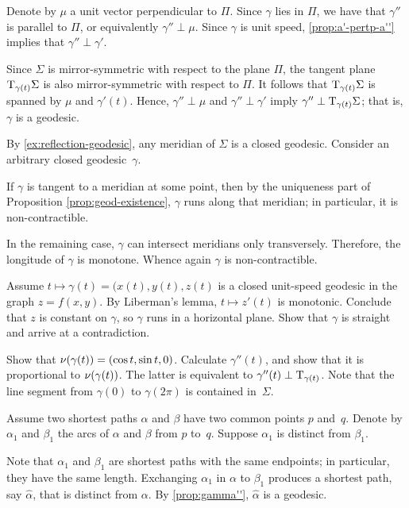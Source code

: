 \begin{multicols}{2}
Denote by $\mu$ a unit vector perpendicular to $\Pi$.
Since $\gamma$ lies in $\Pi$, we have that $\gamma''$ is parallel to $\Pi$, or equivalently $\gamma''\perp \mu$.
Since $\gamma$ is unit speed, \ref{prop:a'-pertp-a''} implies that $\gamma''\perp\gamma'$.

Since $\Sigma$ is mirror-symmetric with respect to the plane $\Pi$,
the tangent plane $\mathrm{T}_{\gamma(t)}\Sigma$ is also mirror-symmetric with respect to $\Pi$.
It follows that $\mathrm{T}_{\gamma(t)}\Sigma$ is spanned by $\mu$ and $\gamma'(t)$.
Hence, $\gamma''\perp \mu$ and $\gamma''\perp\gamma'$ imply $\gamma''\perp\mathrm{T}_{\gamma(t)}\Sigma$;
that is, $\gamma$ is a geodesic.



By \ref{ex:reflection-geodesic}, any meridian of $\Sigma$ is a closed geodesic.
Consider an arbitrary closed geodesic~$\gamma$.

If $\gamma$ is tangent to a meridian at some point, then by the uniqueness part of Proposition \ref{prop:geod-existence}, $\gamma$ runs along that meridian;
in particular, it is non-contractible.

In the remaining case, $\gamma$ can intersect meridians only transversely.
Therefore, the longitude of $\gamma$ is monotone.
Whence again $\gamma$ is non-contractible.

 Assume $t\mapsto \gamma(t)=(x(t),y(t),z(t)$ is a closed unit-speed geodesic in the graph $z=f(x,y)$.
By Liberman's lemma, $t\mapsto z'(t)$ is monotonic.
Conclude that $z$ is constant on $\gamma$, so $\gamma$ runs in a horizontal plane.
Show that $\gamma$ is straight and arrive at a contradiction.

Show that $\nu(\gamma(t))=(\cos t,\sin t, 0)$.
Calculate $\gamma''(t)$, and show that it is proportional to $\nu(\gamma(t))$.
The latter is equivalent to $\gamma''(t)\perp\mathrm{T}_{\gamma(t)}$. 
Note that the line segment from $\gamma (0) $ to $\gamma (2 \pi) $ is contained in~$\Sigma$.



Assume two shortest paths $\alpha$ and $\beta$ have two common points $p$ and~$q$.
Denote by $\alpha_1$ and $\beta_1$ the arcs of $\alpha$ and $\beta$ from $p$ to~$q$.
Suppose $\alpha_1$ is distinct from $\beta_1$.

Note that $\alpha_1$ and $\beta_1$ are shortest paths with the same endpoints;
in particular, they have the same length.
Exchanging $\alpha_1$ in $\alpha$ to $\beta_1$ produces a shortest path, say $\hat\alpha$, that is distinct from $\alpha$.
By \ref{prop:gamma''}, $\hat\alpha$ is a geodesic.


\end{multicols}
